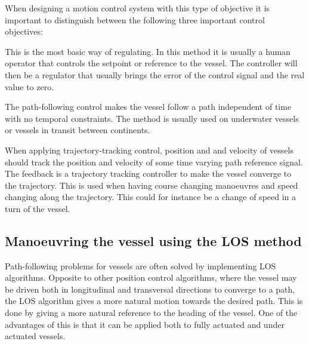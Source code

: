 When designing a motion control system with this type of objective it is important to distinguish between the following three important control objectives:
\begin{description}[style=nextline]
	\item [Setpoint regulation]
	This is the most basic way of regulating. In this method it is usually a human operator that controls the setpoint or reference to the vessel. The controller will then be a regulator that usually brings the error of the control signal and the real value to zero.
	\item [Path-following control]
	The path-following control makes the vessel follow a path independent of time with no temporal constraints. The method is usually used on underwater vessels or vessels in transit between continents.
	\item [Trajectory-tracking control]
	When applying trajectory-tracking control, position and and velocity of vessels should track the position and velocity of some time varying path reference signal. The feedback is a trajectory tracking controller to make the vessel converge to the trajectory. This is used when having course changing manoeuvres and speed changing along the trajectory. This could for instance be a change of speed in a turn of the vessel.
\end{description}

\subsection{Manoeuvring the vessel using the LOS method}
Path-following problems for vessels are often solved by implementing \ac{LOS} algorithms. Opposite to other position control algorithms, where the vessel may be driven both in longitudinal and transversal directions to converge to a path, the \ac{LOS} algorithm gives a more natural motion towards the desired path. This is done by giving a more natural reference to the heading of the vessel. One of the advantages of this is that it can be applied both to fully actuated and under actuated vessels.

